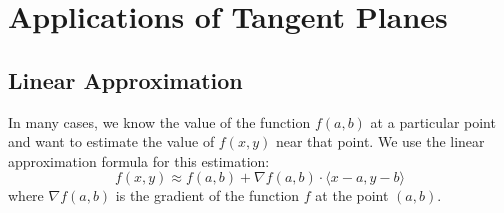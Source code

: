 \documentclass{report}
\begin{document}
\section{Applications of Tangent Planes}

\subsection{Linear Approximation}

In many cases, we know the value of the function \( f(a, b) \) at a particular point and want to estimate the value of \( f(x, y) \) near that point. We use the linear approximation formula for this estimation:
\[
	f(x, y) \approx f(a, b) + \nabla f(a, b) \cdot \langle x - a, y - b \rangle
\]
where \( \nabla f(a, b) \) is the gradient of the function \( f \) at the point \((a, b)\).



%
\end{document}
